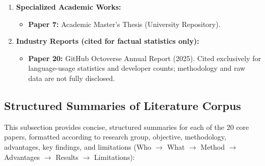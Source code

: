 \documentclass[11pt,a4paper]{article}
\begin{document}
\begin{enumerate}[leftmargin=1.5em, itemsep=3pt]
\begin{itemize}
    \end{itemize}
    \item \textbf{Specialized Academic Works:}
    \begin{itemize}
        \item \textbf{Paper 7:} Academic Master's Thesis (University Repository).
    \end{itemize}
    \item \textbf{Industry Reports (cited for factual statistics only):}
    \begin{itemize}
        \item \textbf{Paper 20:} GitHub Octoverse Annual Report (2025). Cited exclusively for language-usage statistics and developer counts; methodology and raw data are not fully disclosed.
    \end{itemize}
\end{enumerate}

\subsection{Structured Summaries of Literature Corpus}
This subsection provides concise, structured summaries for each of the 20 core papers, formatted according to research group, objective, methodology, advantages, key findings, and limitations (Who $\rightarrow$ What $\rightarrow$ Method $\rightarrow$ Advantages $\rightarrow$ Results $\rightarrow$ Limitations):
\end{document}
